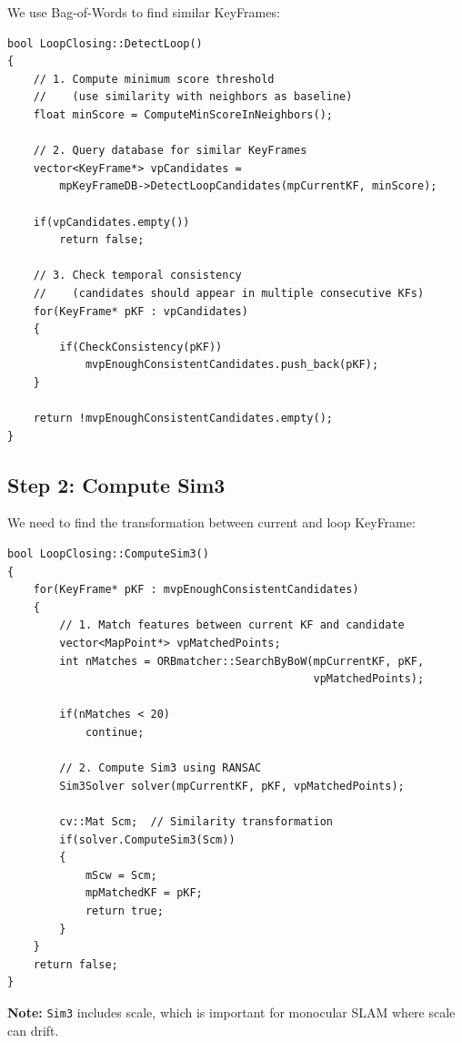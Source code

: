We use Bag-of-Words to find similar KeyFrames:

\begin{lstlisting}[caption={DetectLoop concept}]
bool LoopClosing::DetectLoop()
{
    // 1. Compute minimum score threshold
    //    (use similarity with neighbors as baseline)
    float minScore = ComputeMinScoreInNeighbors();
    
    // 2. Query database for similar KeyFrames
    vector<KeyFrame*> vpCandidates = 
        mpKeyFrameDB->DetectLoopCandidates(mpCurrentKF, minScore);
    
    if(vpCandidates.empty())
        return false;
    
    // 3. Check temporal consistency
    //    (candidates should appear in multiple consecutive KFs)
    for(KeyFrame* pKF : vpCandidates)
    {
        if(CheckConsistency(pKF))
            mvpEnoughConsistentCandidates.push_back(pKF);
    }
    
    return !mvpEnoughConsistentCandidates.empty();
}
\end{lstlisting}

\subsection{Step 2: Compute Sim3}

We need to find the transformation between current and loop KeyFrame:

\begin{lstlisting}[caption={ComputeSim3 concept}]
bool LoopClosing::ComputeSim3()
{
    for(KeyFrame* pKF : mvpEnoughConsistentCandidates)
    {
        // 1. Match features between current KF and candidate
        vector<MapPoint*> vpMatchedPoints;
        int nMatches = ORBmatcher::SearchByBoW(mpCurrentKF, pKF, 
                                               vpMatchedPoints);
        
        if(nMatches < 20)
            continue;
        
        // 2. Compute Sim3 using RANSAC
        Sim3Solver solver(mpCurrentKF, pKF, vpMatchedPoints);
        
        cv::Mat Scm;  // Similarity transformation
        if(solver.ComputeSim3(Scm))
        {
            mScw = Scm;
            mpMatchedKF = pKF;
            return true;
        }
    }
    return false;
}
\end{lstlisting}

\textbf{Note:} \texttt{Sim3} includes scale, which is important for monocular SLAM where scale can drift.

